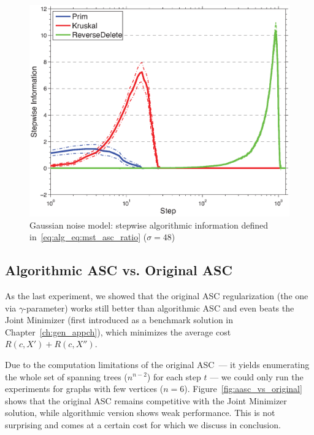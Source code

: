 \begin{figure}[!t]
\centering
\includegraphics[width=.9\textwidth]{figures/ch_mst/gaus_ratio_dyn}
\caption{Gaussian noise model: stepwise algorithmic information defined in~\eqref{eq:alg_eq:mst_asc_ratio} ($\sigma = 48$)}
\label{fig:gaus_ratio_dyn}
\end{figure}
%

\subsection{Algorithmic ASC vs. Original ASC}
\label{sec:aasc_vs_asc}

As the last experiment, we showed that the original ASC regularization (the one
via $\gamma$-parameter) works still better than algorithmic ASC and even beats
the Joint Minimizer (first introduced as a benchmark solution in
Chapter~\ref{ch:gen_appch}), which minimizes the average cost $R(c, X')+R(c, X'')$.

Due to the computation limitations of the original ASC~--- it yields enumerating
the whole set of spanning trees ($n^{n-2}$) for each step $t$ --- we could only
run the experiments for graphs with few vertices ($n = 6$).
Figure~\ref{fig:aasc_vs_original} shows that the original ASC remains
competitive with the Joint Minimizer solution, while algorithmic version shows
weak performance. This is not surprising and comes at a certain cost for which
we discuss in conclusion.

